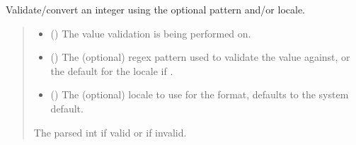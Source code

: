 \documentclass[letterpaper,10pt,english]{sphinxmanual}
\begin{document}
\begin{fulllineitems}
\begin{fulllineitems}
\begin{quote}
\begin{description}
\end{description}\end{quote}

\end{fulllineitems}


\begin{fulllineitems}
\label{\detokenize{apache_commons_validator_python.routines:apache_commons_validator_python.routines.integer_validator.IntegerValidator.validate}}
\pysigstartsignatures
{}
\pysigstopsignatures
\sphinxAtStartPar
Validate/convert an integer using the optional pattern and/or locale.
\begin{quote}\begin{description}
\begin{itemize}
\item {} 
\sphinxAtStartPar
{} () \textendash{} The value validation is being performed on.

\item {} 
\sphinxAtStartPar
{} () \textendash{} The (optional) regex pattern used to validate the value against,
or the default for the locale if .

\item {} 
\sphinxAtStartPar
{} () \textendash{} The (optional) locale to use for the format, defaults to the system default.

\end{itemize}

\sphinxAtStartPar
The parsed int if valid or  if invalid.

\end{description}\end{quote}

\end{fulllineitems}


\end{fulllineitems}
\end{document}
